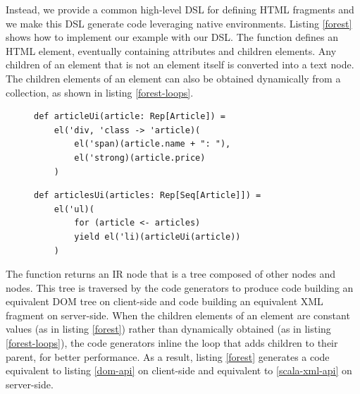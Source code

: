 \documentclass[preprint]{sigplanconf}
\begin{document}
Instead, we provide a common high-level DSL for defining HTML fragments and we make this DSL generate code leveraging
native environments. Listing \ref{forest} shows how to implement our example with our DSL. The  function
defines an HTML element, eventually containing attributes and children elements. Any children of an element that is
not an element itself is converted into a text node. The children elements of an element can also be obtained
dynamically from a collection, as shown in listing \ref{forest-loops}.

\begin{figure}
\begin{lstlisting}[label=forest,caption=DOM definition DSL]
def articleUi(article: Rep[Article]) =
    el('div, 'class -> 'article)(
        el('span)(article.name + ": "),
        el('strong)(article.price)
    )
\end{lstlisting}
\end{figure}

\begin{figure}
\begin{lstlisting}[label=forest-loops,caption=Using loops]
def articlesUi(articles: Rep[Seq[Article]]) =
    el('ul)(
        for (article <- articles)
        yield el('li)(articleUi(article))
    )
\end{lstlisting}
\end{figure}

The  function returns an  IR node that is a tree composed of other  nodes and
 nodes. This tree is traversed by the code generators to produce code building an equivalent DOM tree on
client-side and code building an equivalent XML fragment on server-side. When the children elements of an element are
constant values (as in listing \ref{forest}) rather than dynamically obtained (as in listing \ref{forest-loops}), the
code generators inline the loop that adds children to their parent, for better performance. As a result, listing
\ref{forest} generates a code equivalent to listing \ref{dom-api} on client-side and equivalent to
\ref{scala-xml-api} on server-side.
\end{document}
